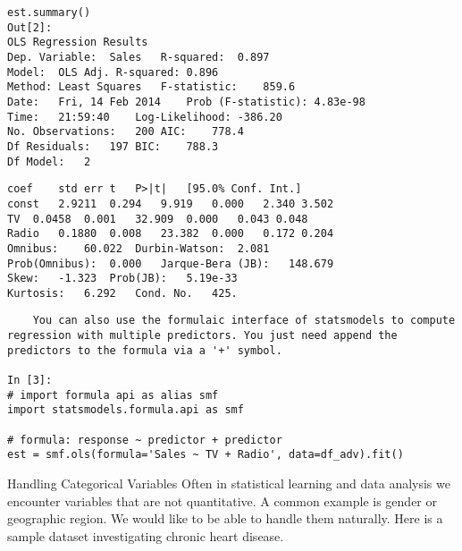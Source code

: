 \begin{frame}[fragile]
	\Large
	\begin{framed}
		\begin{verbatim}
est.summary()
Out[2]:
OLS Regression Results
Dep. Variable:	Sales	R-squared:	0.897
Model:	OLS	Adj. R-squared:	0.896
Method:	Least Squares	F-statistic:	859.6
Date:	Fri, 14 Feb 2014	Prob (F-statistic):	4.83e-98
Time:	21:59:40	Log-Likelihood:	-386.20
No. Observations:	200	AIC:	778.4
Df Residuals:	197	BIC:	788.3
Df Model:	2		
\end{verbatim}
\end{framed}
\end{frame}

\begin{frame}[fragile]
\Large
\begin{framed}
\begin{verbatim}
coef	std err	t	P>|t|	[95.0% Conf. Int.]
const	2.9211	0.294	9.919	0.000	2.340 3.502
TV	0.0458	0.001	32.909	0.000	0.043 0.048
Radio	0.1880	0.008	23.382	0.000	0.172 0.204
Omnibus:	60.022	Durbin-Watson:	2.081
Prob(Omnibus):	0.000	Jarque-Bera (JB):	148.679
Skew:	-1.323	Prob(JB):	5.19e-33
Kurtosis:	6.292	Cond. No.	425.
\end{verbatim}
\end{framed}
\end{frame}

\begin{frame}[fragile]
\Large
\begin{framed}
\begin{verbatim}
	You can also use the formulaic interface of statsmodels to compute regression with multiple predictors. You just need append the predictors to the formula via a '+' symbol.

In [3]:
# import formula api as alias smf
import statsmodels.formula.api as smf

# formula: response ~ predictor + predictor
est = smf.ols(formula='Sales ~ TV + Radio', data=df_adv).fit()
\end{verbatim}
\end{framed}
\end{frame}

\begin{frame}[fragile]
	\Large
	Handling Categorical Variables
Often in statistical learning and data analysis we encounter variables that are not quantitative. A common example is gender or geographic region. We would like to be able to handle them naturally. Here is a sample dataset investigating chronic heart disease.
\end{frame}

